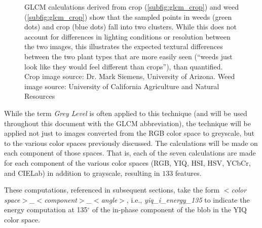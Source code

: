 \documentclass[letterpaper]{report}
\begin{document}
\begin{figure}[H]
\begin{subfigure}[h]{0.28\linewidth}
	\end{subfigure}%
	\hfill
	\caption[An example of GLCM calculations for weed and crop]{GLCM calculations derived from crop (\ref{subfig:glcm_crop}) and weed (\ref{subfig:glcm_crop}) show that the sampled points in weeds (green dots) and crop (blue dots) fall into two clusters. While this does not account for differences in lighting conditions or resolution between the two images, this illustrates the expected textural differences between the two plant types that are more easily seen (``weeds just look like they would feel different than crops''), than quantified. Crop image source: Dr. Mark Siemens, University of Arizona. Weed image source: University of California Agriculture and Natural Resources}
	\label{fig:glcm}
\end{figure}

While the term \textit{Grey Level} is often applied to this technique (and will be used throughout this document with the GLCM abbreviation), the technique will be applied not just to images converted from the RGB color space to greyscale, but to the various color spaces previously discussed. The calculations will be made on each component of those spaces.  That is, each of the seven calculations are made for each component of the various color spaces (RGB, YIQ, HSI, HSV, YCbCr, and CIELab) in addition to grayscale, resulting in  $133$ features.

These computations, referenced in subsequent sections, take the form \textit{$<$color space$>$\_$<$component$>$\_$<$angle$>$}, i.e., \textit{yiq\_i\_energy\_135} to indicate the energy computation at 135$^{\circ}$ of the in-phase component of the blob in the YIQ color space.

%
%
\end{document}
